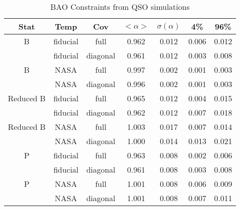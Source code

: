 \begin{table}
\caption{‌BAO Constraints from QSO simulations}
\begin{center}
\begin{tabular}{ccccccc}
Stat & Temp & Cov &$< \alpha >$ & $\sigma(\alpha) $ & 4\%&96\%\\
\hline
                            B  &   fiducial & full & 0.962 & 0.012& 0.006 & 0.012\\ 
 &   fiducial & diagonal & 0.961 & 0.012 &0.003 &0.008\\ 
\hline
                            B  &       NASA & full & 0.997 & 0.002& 0.001 & 0.003\\ 
 &       NASA & diagonal & 0.996 & 0.002 &0.001 &0.003\\ 
\hline
                    Reduced B  &   fiducial & full & 0.965 & 0.012& 0.004 & 0.015\\ 
 &   fiducial & diagonal & 0.962 & 0.012 &0.007 &0.018\\ 
\hline
                    Reduced B  &       NASA & full & 1.003 & 0.017& 0.007 & 0.014\\ 
 &       NASA & diagonal & 1.000 & 0.014 &0.013 &0.021\\ 
\hline
                            P  &   fiducial & full & 0.963 & 0.008& 0.002 & 0.006\\ 
 &   fiducial & diagonal & 0.961 & 0.008 &0.003 &0.008\\ 
\hline
                            P  &       NASA & full & 1.001 & 0.008& 0.006 & 0.009\\ 
 &       NASA & diagonal & 1.001 & 0.008 &0.007 &0.011
\end{tabular}
\end{center}
\label{label:qso}
\end{table}





